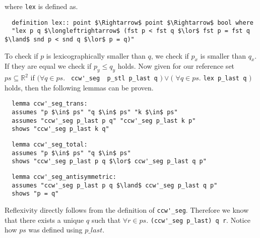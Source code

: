 where \lstinline|lex| is defined as.
\begin{lstlisting}
  definition lex:: point $\Rightarrow$ point $\Rightarrow$ bool where
  "lex p q $\longleftrightarrow$ (fst p < fst q $\lor$ fst p = fst q $\land$ snd p < snd q $\lor$ p = q)"
\end{lstlisting}
To check if $p$ is lexicographically smaller than $q$, we check if $p_x$ is smaller than $q_x$. If 
they are equal we check if $p_y \leq q_y$ holds. Now given for our reference set 
$ps \subseteq \mathbb{R}^2$ if $(\forall q \in ps.$  \lstinline| ccw'_seg  p_stl p_last q| $)\lor($
$\forall q \in ps.$ \lstinline|lex p_last q| $)$ holds, then the following lemmas can be proven.
\begin{lstlisting}
  lemma ccw'_seg_trans:
  assumes "p $\in$ ps" "q $\in$ ps" "k $\in$ ps"
  assumes "ccw'_seg p_last p q" "ccw'_seg p_last k p"
  shows "ccw'_seg p_last k q"
\end{lstlisting}
\begin{lstlisting}
  lemma ccw'_seg_total:
  assumes "p $\in$ ps" "q $\in$ ps"
  shows "ccw'_seg p_last p q $\lor$ ccw'_seg p_last q p"
\end{lstlisting}
\begin{lstlisting}
  lemma ccw'_seg_antisymmetric:
  assumes "ccw'_seg p_last p q $\land$ ccw'_seg p_last q p"
  shows "p = q"
\end{lstlisting}
Reflexivity directly follows from the definition of \lstinline|ccw'_seg|. Therefore we know
that there exists a unique $q$ such that $\forall r \in ps.$ \lstinline|(ccw'_seg p_last) q r|.
Notice how $ps$ was defined using $p\_last$.
